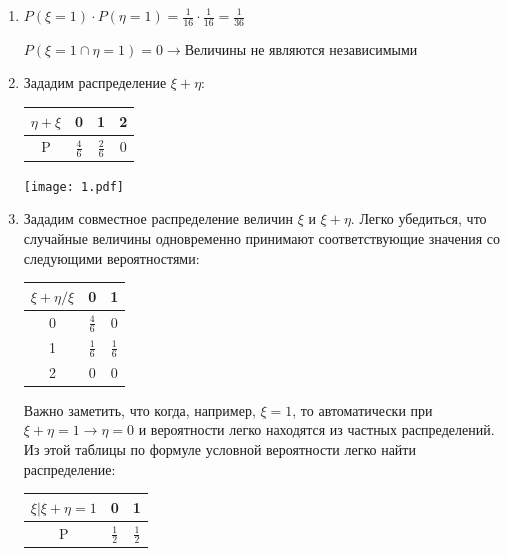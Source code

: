 \begin{enumerate}
\begin{enumerate}
\begin{center}
\begin{tabular}{|c|c|c|}
	\end{tabular}
\end{center} 


\item
$ P(\xi = 1) \cdot P(\eta = 1) = \frac{1}{16} \cdot \frac{1 }{16} = \frac{1}{36} $

$ P(\xi = 1 \cap \eta = 1) = 0 \to \text{Величины не являются независимыми}$

\item

Зададим распределение $ \xi + \eta $:
\begin{center}
	\begin{tabular}{|c|c|c|c|}
		\hline
		$ \eta + \xi $ & 0 & 1 & 2\\
		\hline
		P & $ \frac{4}{6} $ & $ \frac{2}{6} $ & 0\\
		\hline

		
	\end{tabular}
\end{center} 

\texttt{[image: 1.pdf]}

\item 
Зададим совместное распределение величин $ \xi $ и $ \xi + \eta  $. Легко убедиться, что случайные величины одновременно принимают соответствующие значения со следующими вероятностями:

\begin{center}
	\begin{tabular}{|c|c|c|}
		\hline
		$ \xi + \eta / \xi $ & 0 & 1\\
		\hline
		0 & $ \frac{4}{6} $ & $ 0 $ \\
		\hline
		1 & $ \frac{1}{6} $  & $ \frac{1}{6} $ \\
		\hline
		2 & 0  & 0 \\
		\hline
	\end{tabular}
\end{center}

Важно заметить, что когда, например, $ \xi = 1 $, то автоматически при $ \xi + \eta  = 1 \to \eta = 0 $ и вероятности легко находятся из частных распределений. Из этой таблицы по формуле условной вероятности легко найти распределение:

\begin{center}

	\begin{tabular}{|c|c|c|}
		\hline
		$ \xi | \xi + \eta = 1 $ & 0 & 1\\
		\hline
		P & $ \frac{1}{2} $ & $ \frac{1}{2} $ \\
		\hline
		

\end{tabular}
\end{center}
\end{enumerate}
\end{enumerate}
